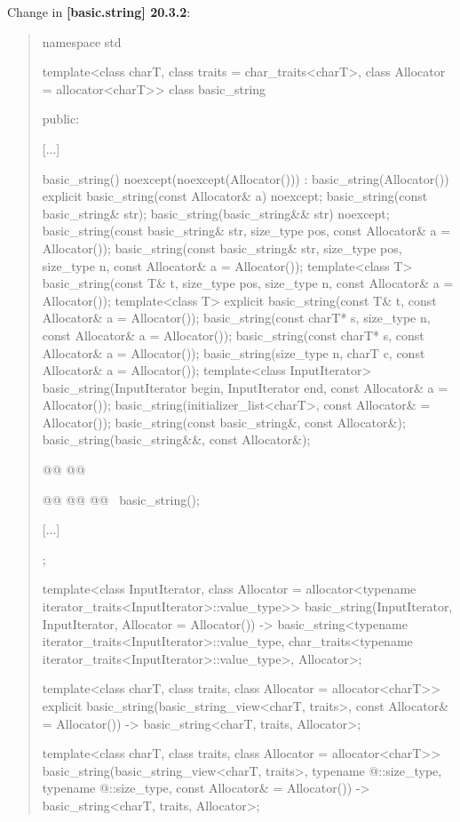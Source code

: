 \documentclass{wg21}
\begin{document}
Change in \textbf{[basic.string] 20.3.2}:
\begin{quote}
\begin{codeblock}
namespace std {
template<class charT, class traits = char_traits<charT>,
class Allocator = allocator<charT>>
class basic_string {
    public:

    [...]

    basic_string() noexcept(noexcept(Allocator())) : basic_string(Allocator()) { }
    explicit basic_string(const Allocator& a) noexcept;
    basic_string(const basic_string& str);
    basic_string(basic_string&& str) noexcept;
    basic_string(const basic_string& str, size_type pos, const Allocator& a = Allocator());
    basic_string(const basic_string& str, size_type pos, size_type n,
    const Allocator& a = Allocator());
    template<class T>
    basic_string(const T& t, size_type pos, size_type n, const Allocator& a = Allocator());
    template<class T>
    explicit basic_string(const T& t, const Allocator& a = Allocator());
    basic_string(const charT* s, size_type n, const Allocator& a = Allocator());
    basic_string(const charT* s, const Allocator& a = Allocator());
    basic_string(size_type n, charT c, const Allocator& a = Allocator());
    template<class InputIterator>
    basic_string(InputIterator begin, InputIterator end, const Allocator& a = Allocator());
    basic_string(initializer_list<charT>, const Allocator& = Allocator());
    basic_string(const basic_string&, const Allocator&);
    basic_string(basic_string&&, const Allocator&);

    @@
    @@

    @@
    @@
    @@
    ~basic_string();

    [...]
};

template<class InputIterator,
class Allocator = allocator<typename iterator_traits<InputIterator>::value_type>>
basic_string(InputIterator, InputIterator, Allocator = Allocator())
-> basic_string<typename iterator_traits<InputIterator>::value_type,
char_traits<typename iterator_traits<InputIterator>::value_type>,
Allocator>;

template<class charT,
class traits,
class Allocator = allocator<charT>>
explicit basic_string(basic_string_view<charT, traits>, const Allocator& = Allocator())
-> basic_string<charT, traits, Allocator>;

template<class charT,
class traits,
class Allocator = allocator<charT>>
basic_string(basic_string_view<charT, traits>,
typename @\seebelow@::size_type, typename @\seebelow@::size_type,
const Allocator& = Allocator())
-> basic_string<charT, traits, Allocator>;
}
\end{codeblock}
\end{quote}
\end{document}
